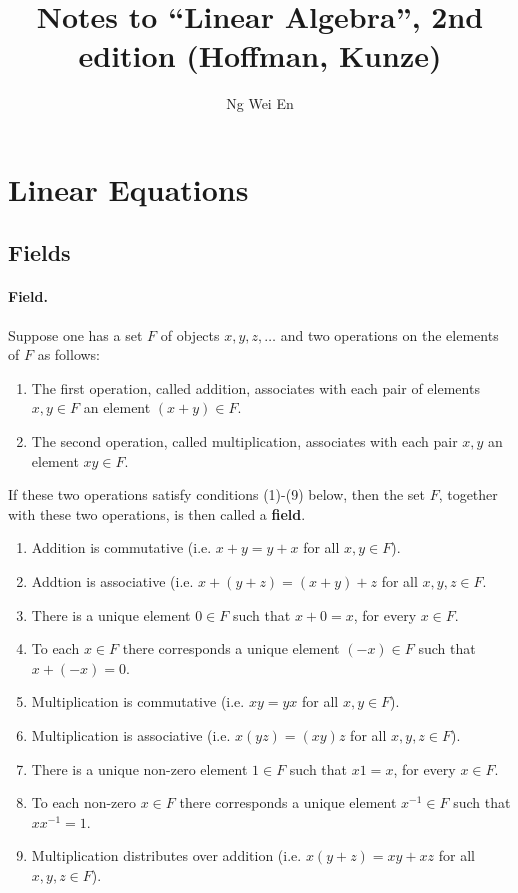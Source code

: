 \documentclass{article}
\title{Notes to ``Linear Algebra'', 2nd edition (Hoffman, Kunze)}
\author{Ng Wei En}
\begin{document}
\maketitle
\tableofcontents
\newpage

\section{Linear Equations}

\subsection{Fields}

\paragraph{Field.} Suppose one has a set $F$ of objects $x, y, z, \ldots$ and
two operations on the elements of $F$ as follows:

\begin{enumerate}
  \item The first operation, called addition, associates with each pair of
    elements $x, y \in F$ an element $(x + y) \in F$.
  \item The second operation, called multiplication, associates with each pair
    $x, y$ an element $xy \in F$.
\end{enumerate}

If these two operations satisfy conditions (1)-(9) below, then the set $F$,
together with these two operations, is then called a \textbf{field}.

\begin{enumerate}
  \item Addition is commutative (i.e. $x + y = y + x$ for all $x, y \in F$).
  \item Addtion is associative (i.e. $x + (y + z) = (x + y) + z$ for all $x, y,
    z \in F$.
  \item There is a unique element $0 \in F$ such that $x + 0 = x$, for every $x
    \in F$.
  \item To each $x \in F$ there corresponds a unique element $(-x) \in F$ such
    that $x + (-x) = 0$.
  \item Multiplication is commutative (i.e. $xy = yx$ for all $x, y \in F$).
  \item Multiplication is associative (i.e. $x(yz) = (xy)z$ for all $x, y, z
    \in F$).
  \item There is a unique non-zero element $1 \in F$ such that $x1 = x$, for
    every $x \in F$.
  \item To each non-zero $x \in F$ there corresponds a unique element $x^{-1}
    \in F$ such that $xx^{-1} = 1$.
  \item Multiplication distributes over addition (i.e. $x(y + z) = xy + xz$ for
    all $x, y, z \in F$).
\end{enumerate}
\end{document}
